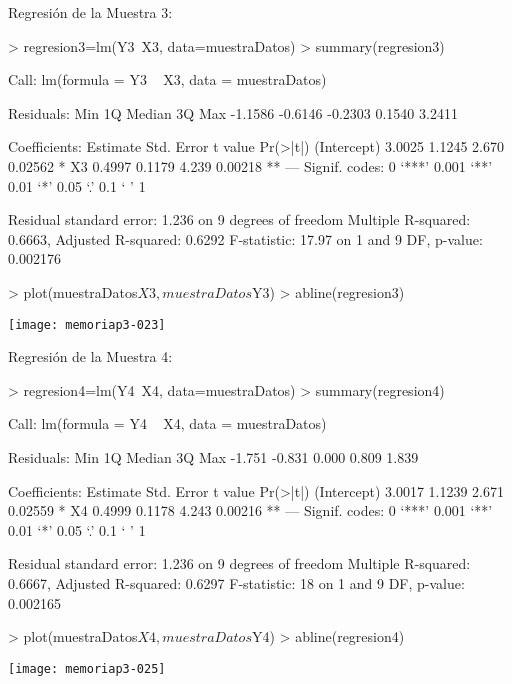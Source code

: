 \documentclass [a4paper] {article}
\begin{document}
Regresión de la Muestra 3:

\begin{Schunk}
\begin{Sinput}
> regresion3=lm(Y3~X3, data=muestraDatos)
> summary(regresion3)
\end{Sinput}
\begin{Soutput}
Call:
lm(formula = Y3 ~ X3, data = muestraDatos)

Residuals:
    Min      1Q  Median      3Q     Max 
-1.1586 -0.6146 -0.2303  0.1540  3.2411 

Coefficients:
            Estimate Std. Error t value Pr(>|t|)   
(Intercept)   3.0025     1.1245   2.670  0.02562 * 
X3            0.4997     0.1179   4.239  0.00218 **
---
Signif. codes:  0 ‘***’ 0.001 ‘**’ 0.01 ‘*’ 0.05 ‘.’ 0.1 ‘ ’ 1

Residual standard error: 1.236 on 9 degrees of freedom
Multiple R-squared:  0.6663,	Adjusted R-squared:  0.6292 
F-statistic: 17.97 on 1 and 9 DF,  p-value: 0.002176
\end{Soutput}
\end{Schunk}
\begin{Schunk}
\begin{Sinput}
> plot(muestraDatos$X3, muestraDatos$Y3)
> abline(regresion3)
\end{Sinput}
\end{Schunk}
\texttt{[image: memoriap3-023]}

Regresión de la Muestra 4:

\begin{Schunk}
\begin{Sinput}
> regresion4=lm(Y4~X4, data=muestraDatos)
> summary(regresion4)
\end{Sinput}
\begin{Soutput}
Call:
lm(formula = Y4 ~ X4, data = muestraDatos)

Residuals:
   Min     1Q Median     3Q    Max 
-1.751 -0.831  0.000  0.809  1.839 

Coefficients:
            Estimate Std. Error t value Pr(>|t|)   
(Intercept)   3.0017     1.1239   2.671  0.02559 * 
X4            0.4999     0.1178   4.243  0.00216 **
---
Signif. codes:  0 ‘***’ 0.001 ‘**’ 0.01 ‘*’ 0.05 ‘.’ 0.1 ‘ ’ 1

Residual standard error: 1.236 on 9 degrees of freedom
Multiple R-squared:  0.6667,	Adjusted R-squared:  0.6297 
F-statistic:    18 on 1 and 9 DF,  p-value: 0.002165
\end{Soutput}
\end{Schunk}
\begin{Schunk}
\begin{Sinput}
> plot(muestraDatos$X4, muestraDatos$Y4)
> abline(regresion4)
\end{Sinput}
\end{Schunk}
\texttt{[image: memoriap3-025]}
\end{document}
